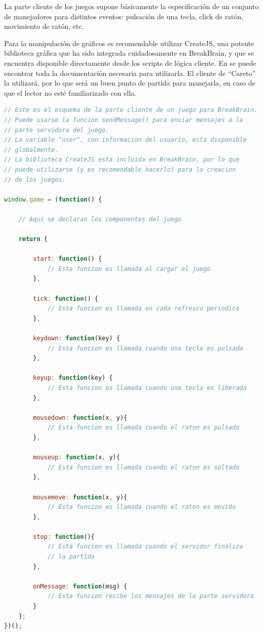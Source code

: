 La parte cliente de los juegos supone básicamente la especificación de un conjunto de manejadores para distintos eventos: pulsación de una tecla, click de ratón, movimiento de ratón, etc.

Para la manipulación de gráficos es recomendable utilizar CreateJS, una potente biblioteca gráfica que ha sido integrada cuidadosamente en BreakBrain, y que se encuentra disponible directamente desde los scripts de lógica cliente. En \cite{CreateJS} se puede encontrar toda la documentación necesaria para utilizarla. El cliente de ``Careto'' la utilizará, por lo que será un buen punto de partida para manejarla, en caso de que el lector no esté familiarizado con ella.

\vspace{1cm}
\begin{lstlisting}[frame=single, language=JavaScript, caption={Esquema de la parte cliente de un juego para BreakBrain}, label=code::game-client-scheme]
// Este es el esquema de la parte cliente de un juego para BreakBrain.
// Puede usarse la funcion sendMessage() para enviar mensajes a la
// parte servidora del juego.
// La variable "user", con informacion del usuario, esta disponible
// globalmente.
// La biblioteca CreateJS esta incluida en BreakBrain, por lo que
// puede utilizarse (y es recomendable hacerlo) para la creacion
// de los juegos.

window.game = (function() {

    // Aqui se declaran los componentes del juego

    return {

        start: function() {
            // Esta funcion es llamada al cargar el juego
        },

        tick: function() {
            // Esta funcion es llamada en cada refresco periodico
        },

        keydown: function(key) {
            // Esta funcion es llamada cuando una tecla es pulsada
        },

        keyup: function(key) {
            // Esta funcion es llamada cuando una tecla es liberada
        },

        mousedown: function(x, y){
            // Esta funcion es llamada cuando el raton es pulsado
        },

        mouseup: function(x, y){
            // Esta funcion es llamada cuando el raton es soltado
        },

        mousemove: function(x, y){
            // Esta funcion es llamada cuando el raton es movido
        },

        stop: function(){
            // Esta funcion es llamada cuando el servidor finaliza
            // la partida
        },

        onMessage: function(msg) {
            // Esta funcion recibe los mensajes de la parte servidora
        }
    };
})();
\end{lstlisting}

